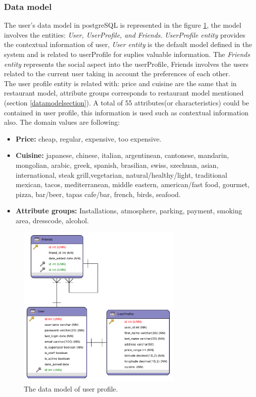 \subsubsection{Data model} 

The user's data model in postgreSQL is represented in the figure
\ref{fig:datausermodel}, the model involves the entities:
\textit{User, UserProfile, and Friends.} \textit{UserProfile entity}
provides the contextual information of user, \textit{User entity} is
the default model defined in the system and is related to userProfile
for suplies valuable information. The \textit{Friends entity}
represents the social aspect into the userProfile, Friends involves
the users related to the current user taking in account the
preferences of each other. \\The user profile entity is related with: 
price and cuisine are the same that in restaurant model,
attribute groups corresponds to restaurant model mentioned (section
\ref{datamodelsection}). A total of 55 attributes(or characteristics) could
be contained in user profile, this information is used such as 
contextual information also. The domain values are following:
\begin{itemize}
\item \textbf{Price:} cheap, regular, expensive, too expensive.
\item \textbf{Cuisine:} japanese, chinese, italian, argentinean,
cantonese, mandarin, mongolian, arabic, greek, spanish, brasilian,
swiss, szechuan, asian, international, steak grill,vegetarian,
natural/healthy/light, traditional mexican, tacos, mediterranean,
middle eastern, american/fast food, gourmet, pizza, bar/beer, tapas
cafe/bar, french, birds, seafood.
\item  \textbf{Attribute groups:} Installations, atmosphere, 
parking, payment, smoking area, dresscode, alcohol.
\end{itemize}
\begin{figure}
\captionsetup{font=footnotesize}
\centering
\includegraphics[width=8cm,height=8cm,keepaspectratio]
{img/data-usermodel.png}
\caption{The data model of user profile.}
\label{fig:datausermodel}     
\end{figure}

